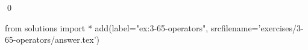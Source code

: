 
\begin{ex}
  \label{ex:3-65-operators}
  
  \qed
\end{ex}
\begin{python0}
from solutions import *
add(label="ex:3-65-operators",
    srcfilename='exercises/3-65-operators/answer.tex')
\end{python0}
